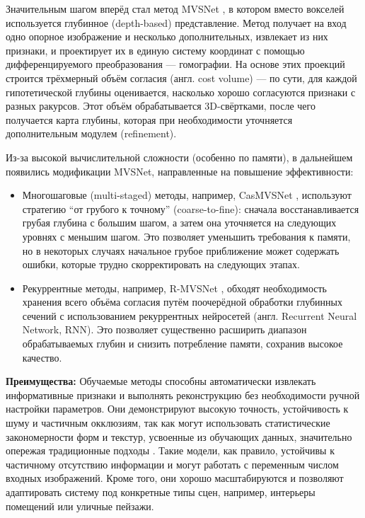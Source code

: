 Значительным шагом вперёд стал метод MVSNet
\cite{yao2018mvsnetdepthinferenceunstructured}, в котором вместо вокселей
используется глубинное (depth-based) представление. Метод получает на вход одно
опорное изображение и несколько дополнительных, извлекает из них признаки, и
проектирует их в единую систему координат с помощью дифференцируемого
преобразования — гомографии. На основе этих проекций строится трёхмерный
объём согласия (англ. cost volume) — по сути, для каждой гипотетической глубины
оценивается, насколько хорошо согласуются признаки с разных ракурсов. Этот объём
обрабатывается 3D-свёртками, после чего получается карта глубины, которая при
необходимости уточняется дополнительным модулем (refinement).

Из-за высокой вычислительной сложности (особенно по памяти), в дальнейшем
появились модификации MVSNet, направленные на повышение эффективности:

\begin{itemize}
	\item Многошаговые (multi-staged) методы, например, CasMVSNet
	\cite{gu2020cascadecostvolumehighresolution}, используют стратегию ``от
	грубого к точному'' (coarse-to-fine): сначала восстанавливается грубая глубина
	с большим шагом, а затем она уточняется на следующих уровнях с меньшим шагом.
	Это позволяет уменьшить требования к памяти, но в некоторых случаях начальное
	грубое приближение может содержать ошибки, которые трудно скорректировать на
	следующих этапах.
	\item Рекуррентные методы, например, R-MVSNet
	\cite{yao2019recurrentmvsnethighresolutionmultiview}, обходят необходимость
	хранения всего объёма согласия путём поочерёдной обработки глубинных сечений с
	использованием рекуррентных нейросетей (англ. Recurrent Neural Network, RNN).
	Это позволяет существенно расширить диапазон обрабатываемых глубин и снизить
	потребление памяти, сохранив высокое качество.
\end{itemize}

\textbf{Преимущества:}
Обучаемые методы способны автоматически извлекать информативные признаки и
выполнять реконструкцию без необходимости ручной настройки параметров. Они
демонстрируют высокую точность, устойчивость к шуму и частичным окклюзиям, так
как могут использовать статистические закономерности форм и текстур, усвоенные
из обучающих данных, значительно опережая традиционные подходы
\cite{10.1109/CVPR.2017.272}. Такие модели, как правило, устойчивы к
частичному отсутствию информации и могут работать с переменным числом входных
изображений. Кроме того, они хорошо масштабируются и позволяют адаптировать
систему под конкретные типы сцен, например, интерьеры помещений или уличные
пейзажи.

